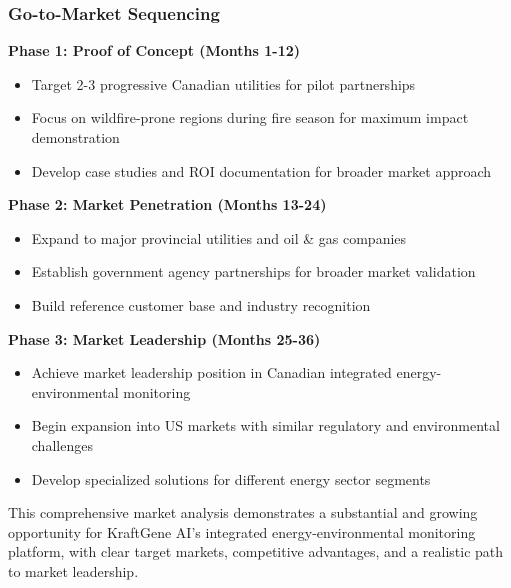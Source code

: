 \subsubsection{Go-to-Market Sequencing}

\textbf{Phase 1: Proof of Concept (Months 1-12)}
\begin{itemize}
    \item Target 2-3 progressive Canadian utilities for pilot partnerships
    \item Focus on wildfire-prone regions during fire season for maximum impact demonstration
    \item Develop case studies and ROI documentation for broader market approach
\end{itemize}

\textbf{Phase 2: Market Penetration (Months 13-24)}
\begin{itemize}
    \item Expand to major provincial utilities and oil & gas companies
    \item Establish government agency partnerships for broader market validation
    \item Build reference customer base and industry recognition
\end{itemize}

\textbf{Phase 3: Market Leadership (Months 25-36)}
\begin{itemize}
    \item Achieve market leadership position in Canadian integrated energy-environmental monitoring
    \item Begin expansion into US markets with similar regulatory and environmental challenges
    \item Develop specialized solutions for different energy sector segments
\end{itemize}

This comprehensive market analysis demonstrates a substantial and growing opportunity for KraftGene AI's integrated energy-environmental monitoring platform, with clear target markets, competitive advantages, and a realistic path to market leadership.
